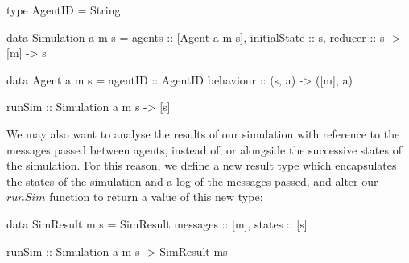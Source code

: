 \documentclass[a4paper, 11pt]{article}
\begin{document}
\begin{code}

  type AgentID = String

  data Simulation a m s = { 
    agents :: [Agent a m s],
    initialState :: s, 
    reducer :: s -> [m] -> s
  }
  
  data Agent a m s = {
    agentID   :: AgentID
    behaviour :: (s, a) -> ([m], a)
  }
  
  runSim :: Simulation a m s -> [s]

\end{code}

We may also want to analyse the results of our simulation with reference to the messages passed between agents, instead of, or alongside the successive states of the simulation. For this reason, we define a new result type which encapsulates the states of the simulation and a log of the messages passed, and alter our $runSim$ function to return a value of this new type:

\begin{code}
  data SimResult m s = SimResult { 
    messages :: [m],
    states :: [s]
  }

  runSim :: Simulation a m s -> SimResult ms
\end{code}
\end{document}
